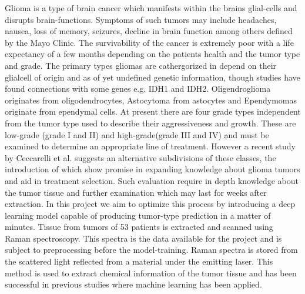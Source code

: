 Glioma is a type of brain cancer which manifests within the brains glial-cells and disrupts brain-functions. Symptoms of such tumors may include headaches, nausea, loss of memory, seizures, decline in brain function among others defined by the Mayo Clinic\cite{mayoglioma}. The survivability of the cancer is extremely poor with a life expectancy of a few months depending on the patients health and the tumor type and grade. The primary types gliomas are cathergorized in depend on their glialcell of origin and as of yet undefined genetic information, though studies have found connections with some genes e.g. IDH1 and IDH2\cite{cellsubsets}. Oligendroglioma originates from oligodendrocytes, Astocytoma from astocytes and Ependymomas originate from ependymal cells\cite{nihglioma}. At present there are four grade types independent from the tumor type used to describe their aggressiveness and growth. These are low-grade (grade I and II) and high-grade(grade III and IV) and must be examined to determine an appropriate line of treatment\cite{hopkinsglioma}. However a recent study by Ceccarelli et al. suggests an alternative subdivisions of these classes, the introduction of which show promise in expanding knowledge about glioma tumors and aid in treatment selection\cite{cellsubsets}. Such evaluation require in depth knowledge about the tumor tissue and  further examination which may last for weeks after extraction. In this project we aim to optimize this process by introducing a deep learning model capable of producing tumor-type prediction in a matter of minutes. Tissue from tumors of 53 patients is extracted and scanned using Raman spectroscopy. This spectra is the data available for the project and is subject to preprocessing before the model-training. Raman spectra is stored from the scattered light reflected from a material under the emitting laser. This method is used to extract chemical information of the tumor tissue and has been successful in previous studies where machine learning has been applied\cite{ramanUseful0}.